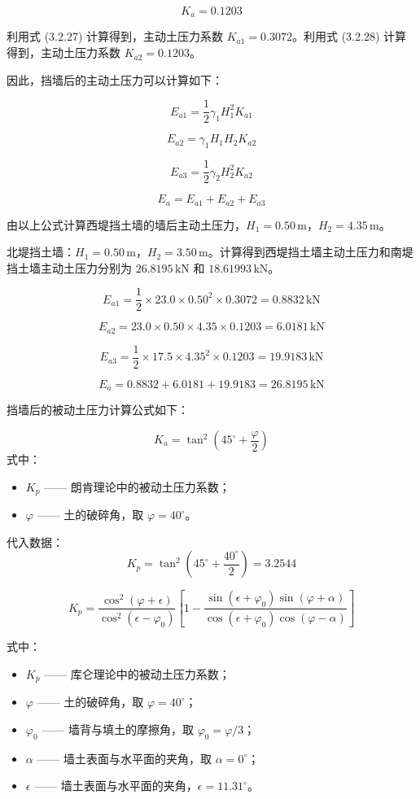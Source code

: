 \documentclass[UTF8, a4paper, 12pt]{ctexart} %
\begin{document}
\[
K_a = 0.1203
\]

利用式 (3.2.27) 计算得到，主动土压力系数 $K_{a1} = 0.3072$。利用式 (3.2.28) 计算得到，主动土压力系数 $K_{a2} = 0.1203$。

因此，挡墙后的主动土压力可以计算如下：

\[
E_{a1} = \frac{1}{2} \gamma_1 H_1^2 K_{a1} 
\]

\[
E_{a2} = \gamma_1 H_1 H_2 K_{a2} 
\]

\[
E_{a3} = \frac{1}{2} \gamma_2 H_2^2 K_{a2} 
\]

\[
E_a = E_{a1} + E_{a2} + E_{a3} 
\]

由以上公式计算西堤挡土墙的墙后主动土压力，$H_1 = 0.50\,\text{m}$，$H_2 = 4.35\,\text{m}$。

北堤挡土墙：$H_1 = 0.50\,\text{m}$，$H_2 = 3.50\,\text{m}$。计算得到西堤挡土墙主动土压力和南堤挡土墙主动土压力分别为 $26.8195\,\text{kN}$ 和 $18.61993\,\text{kN}$。

\[
E_{a1} = \frac{1}{2} \times 23.0 \times 0.50^2 \times 0.3072 = 0.8832\,\text{kN}
\]

\[
E_{a2} = 23.0 \times 0.50 \times 4.35 \times 0.1203 = 6.0181\,\text{kN}
\]

\[
E_{a3} = \frac{1}{2} \times 17.5 \times 4.35^2 \times 0.1203 = 19.9183\,\text{kN}
\]

\[
E_a = 0.8832 + 6.0181 + 19.9183 = 26.8195\,\text{kN}
\]


挡墙后的被动土压力计算公式如下：

\begin{equation}
K_a = \tan^2 \left( 45^\circ + \frac{\varphi}{2} \right) 
\end{equation}
式中：
\begin{itemize}
    \item $K_p$ —— 朗肯理论中的被动土压力系数；
    \item $\varphi$ —— 土的破碎角，取 $\varphi = 40^\circ$。
\end{itemize}

代入数据：
\[
K_p = \tan^2 \left( 45^\circ + \frac{40^\circ}{2} \right) = 3.2544
\]

\[
K_p = \frac{\cos^2 (\varphi + \epsilon)}{\cos^2 (\epsilon - \varphi_0)} 
\left[ 
1 - \frac{\sin (\epsilon + \varphi_0) \sin (\varphi + \alpha)}{\cos (\epsilon + \varphi_0) \cos (\varphi - \alpha)}
\right] 
\]

式中：
\begin{itemize}
    \item $K_p$ —— 库仑理论中的被动土压力系数；
    \item $\varphi$ —— 土的破碎角，取 $\varphi = 40^\circ$；
    \item $\varphi_0$ —— 墙背与填土的摩擦角，取 $\varphi_0 = \varphi / 3$；
    \item $\alpha$ —— 墙土表面与水平面的夹角，取 $\alpha = 0^\circ$；
    \item $\epsilon$ —— 墙土表面与水平面的夹角，$\epsilon = 11.31^\circ$。
\end{itemize}
\end{document}
